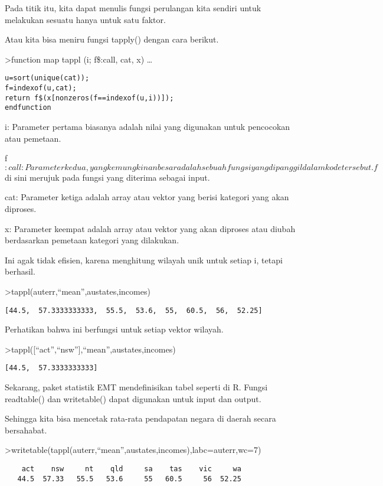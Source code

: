 \documentclass[
]{book}
\begin{document}
Pada titik itu, kita dapat menulis fungsi perulangan kita sendiri untuk melakukan sesuatu hanya untuk satu faktor.

Atau kita bisa meniru fungsi tapply() dengan cara berikut.

\textgreater function map tappl (i; f\$:call, cat, x) \ldots{}

\begin{verbatim}
u=sort(unique(cat));
f=indexof(u,cat);
return f$(x[nonzeros(f==indexof(u,i))]);
endfunction
\end{verbatim}

i: Parameter pertama biasanya adalah nilai yang digunakan untuk pencocokan atau pemetaan.

f\(:call: Parameter kedua, yang kemungkinan besar adalah sebuah fungsi
yang dipanggil dalam kode tersebut. f\) di sini merujuk pada fungsi yang diterima sebagai input.

cat: Parameter ketiga adalah array atau vektor yang berisi kategori yang akan diproses.

x: Parameter keempat adalah array atau vektor yang akan diproses atau diubah berdasarkan pemetaan kategori yang dilakukan.

Ini agak tidak efisien, karena menghitung wilayah unik untuk setiap i, tetapi berhasil.

\textgreater tappl(auterr,``mean'',austates,incomes)

\begin{verbatim}
[44.5,  57.3333333333,  55.5,  53.6,  55,  60.5,  56,  52.25]
\end{verbatim}

Perhatikan bahwa ini berfungsi untuk setiap vektor wilayah.

\textgreater tappl({[}``act'',``nsw''{]},``mean'',austates,incomes)

\begin{verbatim}
[44.5,  57.3333333333]
\end{verbatim}

Sekarang, paket statistik EMT mendefinisikan tabel seperti di R. Fungsi readtable() dan writetable() dapat digunakan untuk input dan output.

Sehingga kita bisa mencetak rata-rata pendapatan negara di daerah secara bersahabat.

\textgreater writetable(tappl(auterr,``mean'',austates,incomes),labc=auterr,wc=7)

\begin{verbatim}
    act    nsw     nt    qld     sa    tas    vic     wa
   44.5  57.33   55.5   53.6     55   60.5     56  52.25
\end{verbatim}
\end{document}
